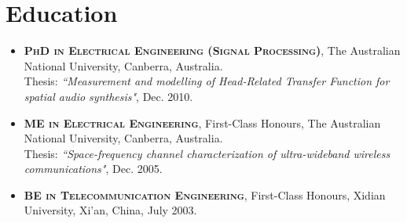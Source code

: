 \documentclass[10pt]{article}
\begin{document}
\section*{Education}
\begin{itemize}
\item \textsc{\textbf{PhD in Electrical Engineering (Signal Processing)}}, The Australian National University,
Canberra, Australia.\\
Thesis: \emph{``Measurement and modelling of Head-Related Transfer Function for spatial audio synthesis"}, Dec.
2010.
\item \textsc{\textbf{ME in Electrical Engineering}}, First-Class Honours, The Australian National University, Canberra, Australia.\\
Thesis: \emph{``Space-frequency channel characterization of ultra-wideband wireless
communications"}, Dec. 2005.
\item \textsc{\textbf{BE in Telecommunication Engineering}},
First-Class Honours, Xidian University, Xi'an, China, July 2003.
\end{itemize}

%
%

%


\end{document}
